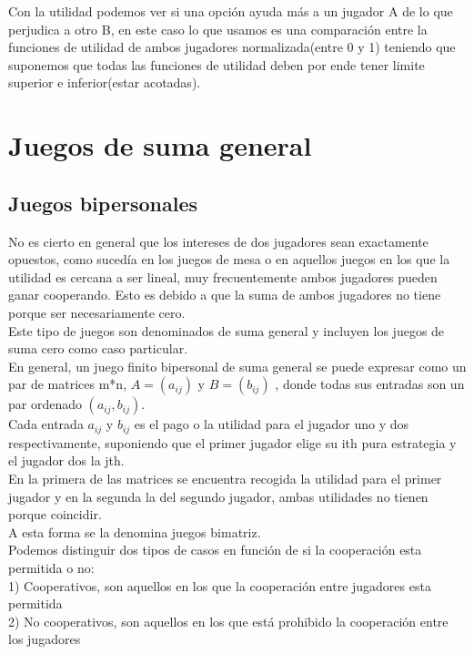 \documentclass[10pt,a4paper]{book}
\begin{document}
Con la utilidad podemos ver si una opción ayuda más a un jugador A de lo que perjudica a otro B, en este caso lo que usamos es una comparación entre la funciones de utilidad de ambos jugadores normalizada(entre 0 y 1) teniendo que suponemos que todas las funciones de utilidad deben por ende tener limite superior e inferior(estar acotadas).	


	 
\newpage


\chapter{Juegos de suma general}

\section{Juegos bipersonales}

No es cierto en general que los intereses de dos jugadores sean exactamente opuestos, como sucedía en los juegos de mesa o en aquellos juegos en los que la utilidad es cercana a ser lineal, muy frecuentemente ambos jugadores pueden ganar cooperando. Esto es debido a que la suma de ambos jugadores no tiene porque ser necesariamente cero.\\

Este tipo de juegos son denominados de suma general y incluyen los juegos de suma cero como caso particular.\\


En general, un juego finito bipersonal de suma general se puede expresar como un par de matrices m*n, $A=(a_{ij})$ y  $B=(b_{ij})$ , donde todas sus entradas son un par ordenado $(a_{ij},b_{ij})$.\\
Cada entrada $a_{ij}$ y $b_{ij}$ es el pago o la utilidad para el jugador uno y dos respectivamente, suponiendo que el primer jugador elige su ith pura estrategia y el jugador dos la jth.\\
En la primera de las matrices se encuentra recogida la utilidad para el primer jugador y en la segunda la del segundo jugador, ambas utilidades no tienen porque coincidir.\\
A esta forma se la denomina juegos bimatriz.\\

Podemos distinguir dos tipos de casos en función de si la cooperación esta permitida o no:\\
1) Cooperativos, son aquellos en los que la cooperación entre jugadores esta permitida\\
2) No cooperativos, son aquellos en los que está prohibido la cooperación entre los jugadores\\
\end{document}
